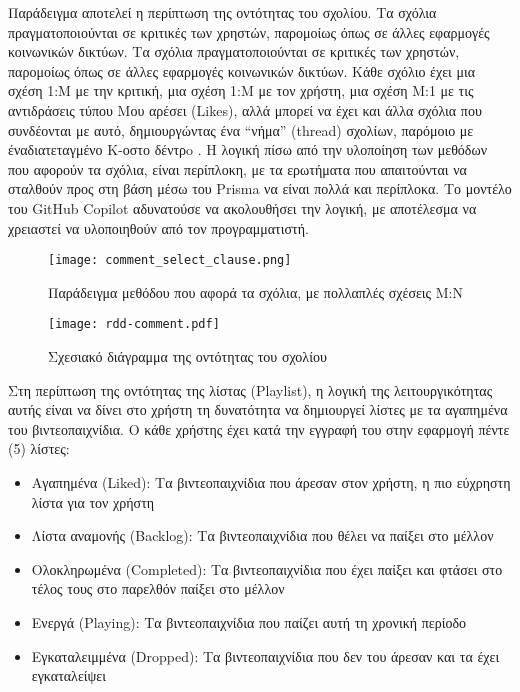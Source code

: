 Παράδειγμα αποτελεί η περίπτωση της οντότητας του σχολίου. Τα σχόλια
πραγματοποιούνται σε κριτικές των χρηστών, παρομοίως όπως σε άλλες
εφαρμογές κοινωνικών δικτύων. Τα σχόλια πραγματοποιούνται σε κριτικές
των χρηστών, παρομοίως όπως σε άλλες εφαρμογές κοινωνικών δικτύων. Κάθε
σχόλιο έχει μια σχέση 1:Μ με την κριτική, μια σχέση 1:Μ με τον χρήστη,
μια σχέση Μ:1 με τις αντιδράσεις τύπου Μου αρέσει \textlatin{(Likes)},
αλλά μπορεί να έχει και άλλα σχόλια που συνδέονται με αυτό,
δημιουργώντας ένα \enquote{νήμα} \textlatin{(thread)} σχολίων, παρόμοιο
με έναδιατεταγμένο Κ-οστο δέντρo \cite{gabillon2002access}. Η λογική
πίσω από την υλοποίηση των μεθόδων που αφορούν τα σχόλια, είναι
περίπλοκη, με τα ερωτήματα που απαιτούνται να σταλθούν προς στη βάση
μέσω του \textlatin{Prisma} να είναι πολλά και περίπλοκα. Το μοντέλο του
\textlatin{GitHub Copilot} αδυνατούσε να ακολουθήσει την λογική, με
αποτέλεσμα να χρειαστεί να υλοποιηθούν από τον προγραμματιστή.

\begin{figure}[H]
  \begin{center}
    \texttt{[image: comment\_select\_clause.png]}
    \label{fig:commentSelectClause}
    \caption{Παράδειγμα μεθόδου που αφορά τα σχόλια, με πολλαπλές
      σχέσεις Μ:Ν}
  \end{center}
\end{figure}

\begin{figure}[H]
  \begin{center}
    \texttt{[image: rdd-comment.pdf]}
    \label{fig:commentRdd}
    \caption{Σχεσιακό διάγραμμα της οντότητας του σχολίου}
  \end{center}
\end{figure}

Στη περίπτωση της οντότητας της λίστας (\textlatin{Playlist}), η λογική
της λειτουργικότητας αυτής είναι να δίνει στο χρήστη τη δυνατότητα να
δημιουργεί λίστες με τα αγαπημένα του βιντεοπαιχνίδια. Ο κάθε χρήστης
έχει κατά την εγγραφή του στην εφαρμογή πέντε (5) λίστες:
\begin{itemize}
\item
  Αγαπημένα (\textlatin{Liked}): Τα βιντεοπαιχνίδια που άρεσαν στον
  χρήστη, η πιο εύχρηστη λίστα για τον χρήστη
\item
  Λίστα αναμονής (\textlatin{Backlog}): Τα βιντεοπαιχνίδια που θέλει να
  παίξει στο μέλλον
\item
  Ολοκληρωμένα (\textlatin{Completed}): Τα βιντεοπαιχνίδια που έχει
  παίξει και φτάσει στο τέλος τους στο παρελθόν παίξει στο μέλλον
\item
  Ενεργά (\textlatin{Playing}): Τα βιντεοπαιχνίδια που παίζει αυτή τη
  χρονική περίοδο
\item
  Εγκαταλειμμένα (\textlatin{Dropped}): Τα βιντεοπαιχνίδια που δεν του
  άρεσαν και τα έχει εγκαταλείψει
\end{itemize}


